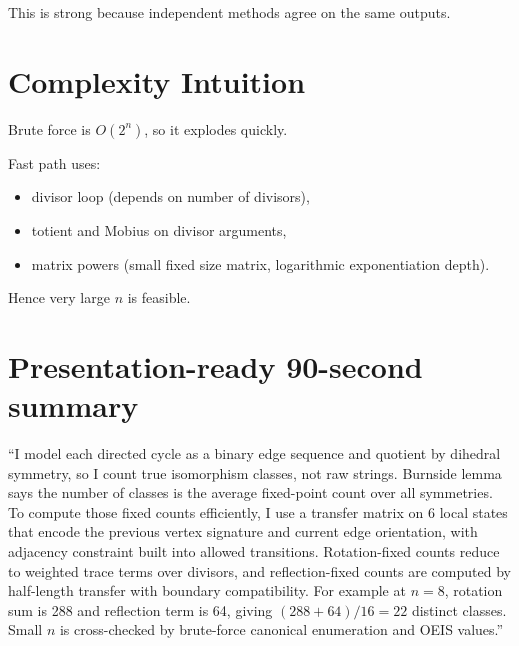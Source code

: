 \documentclass[12pt]{article}
\theoremstyle{definition}
\begin{document}
This is strong because independent methods agree on the same outputs.

\section{Complexity Intuition}
Brute force is \(O(2^n)\), so it explodes quickly.

Fast path uses:
\begin{itemize}
    \item divisor loop (depends on number of divisors),
    \item totient and Mobius on divisor arguments,
    \item matrix powers (small fixed size matrix, logarithmic exponentiation depth).
\end{itemize}
Hence very large \(n\) is feasible.

\section{Presentation-ready 90-second summary}
``I model each directed cycle as a binary edge sequence and quotient by dihedral symmetry, so I count true isomorphism classes, not raw strings. Burnside lemma says the number of classes is the average fixed-point count over all symmetries. To compute those fixed counts efficiently, I use a transfer matrix on 6 local states that encode the previous vertex signature and current edge orientation, with adjacency constraint built into allowed transitions. Rotation-fixed counts reduce to weighted trace terms over divisors, and reflection-fixed counts are computed by half-length transfer with boundary compatibility. For example at \(n=8\), rotation sum is 288 and reflection term is 64, giving \((288+64)/16=22\) distinct classes. Small \(n\) is cross-checked by brute-force canonical enumeration and OEIS values.''
\end{document}
